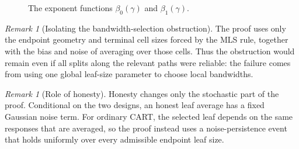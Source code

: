 \documentclass[11pt]{article}
\theoremstyle{plain}
\theoremstyle{definition}
\theoremstyle{remark}
\newtheorem{remark}[theorem]{Remark}
\theoremstyle{plain}
\newcommand{\node}{\mathfrak{t}}
\newcommand{\1}{\mathbbm{1}}
\begin{document}
\begin{figure}[H]
\centering
{}
\caption{The exponent functions $\beta_0(\gamma)$ and $\beta_1(\gamma)$.}
\label{fig:mls-bandwidth-mismatch}
\end{figure}

\begin{remark}[Isolating the bandwidth-selection obstruction]
    The proof uses only the endpoint geometry and terminal cell sizes forced by the MLS rule, together with the bias and noise of averaging over those cells. Thus the obstruction would remain even if all splits along the relevant paths were reliable: the failure comes from using one global leaf-size parameter to choose local bandwidths.
\end{remark}

\begin{remark}[Role of honesty]
    Honesty changes only the stochastic part of the proof. Conditional on the two designs, an honest leaf average has a fixed Gaussian noise term. For ordinary CART, the selected leaf depends on the same responses that are averaged, so the proof instead uses a noise-persistence event that holds uniformly over every admissible endpoint leaf size.
\end{remark}
\end{document}
